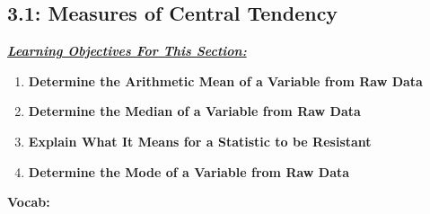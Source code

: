 \documentclass{report}
\begin{document}
        \pagebreak \bigbreak \noindent
        \subsection{3.1: Measures of Central Tendency}
        \bigbreak \noindent 
        \textbf{\textit{\underline{Learning Objectives For This Section:}}}
        \begin{enumerate}
            \item \textbf{Determine the Arithmetic Mean of a Variable from Raw Data}
            \item \textbf{Determine the Median of a Variable from Raw Data}
            \item \textbf{Explain What It Means for a Statistic to be Resistant}
            \item \textbf{Determine the Mode of a Variable from Raw Data}
        \end{enumerate}
        \bigbreak \noindent 
        \textbf{Vocab:}
\end{document}
